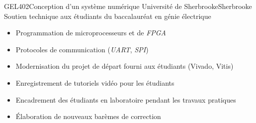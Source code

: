 {GEL402}{Conception d'un système numérique}
{Université de Sherbrooke}{Sherbrooke}
{Soutien technique aux étudiants du baccalauréat en génie électrique}
{\vspace{-12pt}
\begin{itemize}
	\item Programmation de microprocesseurs et de \textit{FPGA}
	\item Protocoles de communication (\textit{UART}, \textit{SPI})
    \item Modernisation du projet de départ fourni aux étudiants (Vivado, Vitis)
    \item Enregistrement de tutoriels vidéo pour les étudiants
    \item Encadrement des étudiants en laboratoire pendant les travaux pratiques
    \item Élaboration de nouveaux barèmes de correction
\end{itemize}}
